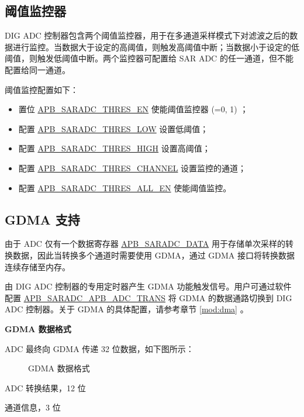 \documentclass[main\_\_CN.tex]{subfiles}
\begin{document}
\subsection{阈值监控器}\label{sec:adc_threshold}

DIG ADC 控制器包含两个阈值监控器，用于在多通道采样模式下对滤波之后的数据进行监控。当数据大于设定的高阈值，则触发高阈值中断；当数据小于设定的低阈值，则触发低阈值中断。两个监控器可配置给 SAR ADC 的任一通道，但不能配置给同一通道。

阈值监控配置如下：
\begin{itemize}
    \item 置位 \hyperref[fielddesc:APBSARADCTHRESALLEN]{APB\_SARADC\_THRES\_EN} 使能阈值监控器  (=0, 1) ；
    \item 配置 \hyperref[fielddesc:APBSARADCTHRES0LOW]{APB\_SARADC\_THRES\_LOW} 设置低阈值；
    \item 配置 \hyperref[fielddesc:APBSARADCTHRES0HIGH]{APB\_SARADC\_THRES\_HIGH} 设置高阈值；
    \item 配置 \hyperref[fielddesc:APBSARADCTHRES0CHANNEL]{APB\_SARADC\_THRES\_CHANNEL} 设置监控的通道；
    \item 配置 \hyperref[fielddesc:APBSARADCTHRESALLEN]{APB\_SARADC\_THRES\_ALL\_EN} 使能阈值监控。
\end{itemize}

\subsection{GDMA 支持}
\label{sec:adc_gdma_support}

由于 ADC 仅有一个数据寄存器 \hyperref[fielddesc:APBSARADCDATA]{APB\_SARADC\_DATA} 用于存储单次采样的转换数据，因此当转换多个通道时需要使用 GDMA，通过 GDMA 接口将转换数据连续存储至内存。

由 DIG ADC 控制器的专用定时器产生 GDMA 功能触发信号。用户可通过软件配置 \hyperref[fielddesc:APBSARADCAPBADCTRANS]{APB\_SARADC\_APB\_ADC\_TRANS} 将 GDMA 的数据通路切换到 DIG ADC 控制器。关于 GDMA 的具体配置，请参考章节 \ref{mod:dma} \textit{}。


\textbf{GDMA 数据格式}

ADC 最终向 GDMA 传递 32 位数据，如下图所示：

\begin{figure}[H]
\centering
{}%
%
%
%
%
\end{figure}
\vspace{-2em}
\begin{figure}[H]
    \centering
    \caption{GDMA 数据格式}
    \label{fig:adc-dma-data-format}
\end{figure}
\vspace{-2em}
\begin{regdesc}\begin{reglist}
\item [data] ADC 转换结果，12 位
\item [ch\_sel] 通道信息，3 位
\end{reglist}\end{regdesc}
\end{document}
